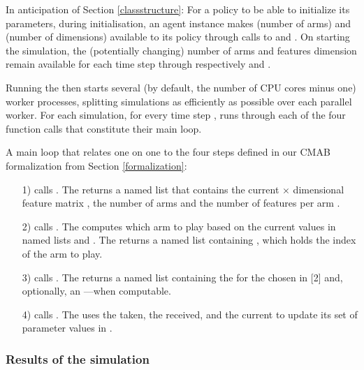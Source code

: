 \documentclass{jss}
\begin{document}
In anticipation of Section \ref{classstructure}: For a policy to be able to initialize its parameters, during initialisation, an agent instance makes  (number of arms) and  (number of dimensions) available to its policy through calls to  and . On starting the simulation, the (potentially changing) number of arms and features dimension remain available for each time step  through respectively  and .

Running the  then starts several (by default, the number of CPU cores minus one) worker processes, splitting simulations as efficiently as possible over each parallel worker. For each simulation, for every time step ,  runs through each of the four function calls that constitute their main loop.

A main loop that relates one on one to the four steps defined in our CMAB formalization from Section \ref{formalization}:

\begin{enumerate}
         \item[1)]  calls . The  returns a named list that contains the current  $\times$  dimensional feature matrix , the number of arms  and the number of features per arm .
         \item[2)]  calls . The  computes which arm to play based on the current values in named lists  and . The  returns a named list containing , which holds the index of the arm to play.
         \item[3)]  calls . The  returns a named list containing the  for the  chosen in [2] and, optionally, an ---when computable.
         \item[4)]  calls . The  uses the  taken, the  received, and the current  to update its set of parameter values in .
\end{enumerate}

\subsubsection{Results of the simulation}
\end{document}
